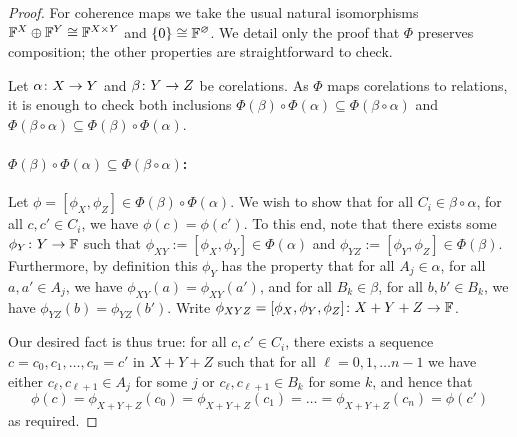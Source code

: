 \begin{proof}
  For coherence maps we take the usual natural isomorphisms ${\mathbb F}^X \oplus {\mathbb F}^Y
  \cong {\mathbb F}^{X \times Y}$ and $\{0\} \cong {\mathbb F}^\varnothing$. We detail only the
  proof that $\Phi$ preserves composition; the other properties are
  straightforward to check.

  Let $\alpha{\colon} X \to Y$ and $\beta{\colon} Y \to Z$ be corelations. As $\Phi$
  maps corelations to relations, it is enough to check both inclusions
  $\Phi(\beta) \circ \Phi(\alpha) \subseteq \Phi(\beta\circ\alpha)$ and
  $\Phi(\beta\circ\alpha) \subseteq \Phi(\beta) \circ \Phi(\alpha)$. 

  \paragraph{$\Phi(\beta) \circ \Phi(\alpha) \subseteq \Phi(\beta\circ\alpha)$:}
  Let $\phi = [\phi_X,\phi_Z] \in \Phi(\beta) \circ \Phi(\alpha)$. We wish to show
  that for all $C_i \in \beta\circ\alpha$, for all $c,c' \in C_i$, we have
  $\phi(c) = \phi(c')$. To this end, note that there exists some $\phi_Y{\colon} Y \to {\mathbb F}$
  such that $\phi_{XY} := [\phi_X,\phi_Y] \in \Phi(\alpha)$ and $\phi_{YZ} :=
  [\phi_Y,\phi_Z] \in \Phi(\beta)$.  Furthermore, by definition this $\phi_Y$ has
  the property that for all $A_j \in \alpha$, for all $a,a' \in A_j$, we have
  $\phi_{XY}(a) = \phi_{XY}(a')$, and for all $B_k \in \beta$, for all $b,b' \in
  B_k$, we have $\phi_{YZ}(b) = \phi_{YZ}(b')$. Write $\phi_{XYZ} =
  [\phi_X,\phi_Y,\phi_Z]{\colon} X+Y+Z \to {\mathbb F}$.

  Our desired fact is thus true: for all $c,c' \in C_i$, there exists a sequence $c=c_0,
  c_1, \dots, c_n=c'$ in $X+Y+Z$ such that for all $\ell=0,1, \dots n-1$ we have
  either $c_\ell, c_{\ell+1} \in A_j$ for some $j$ or $c_\ell,c_{\ell+1} \in B_k$
  for some $k$, and hence that 
  \[
    \phi(c) = \phi_{X+Y+Z}(c_0)= \phi_{X+Y+Z}(c_1) = \dots = \phi_{X+Y+Z}(c_n) =
    \phi(c')
  \]
  as required.


\end{proof}
